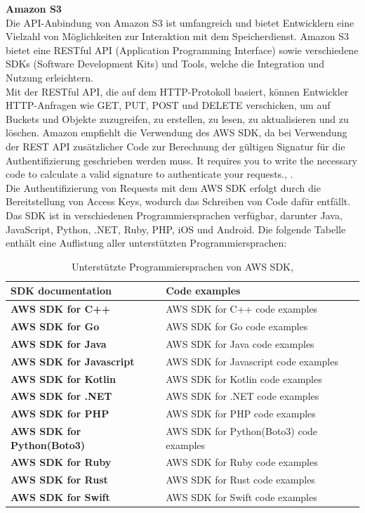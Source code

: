 \textbf{Amazon S3}\\

Die API-Anbindung von Amazon S3 ist umfangreich und bietet Entwicklern eine Vielzahl von Möglichkeiten zur Interaktion mit dem Speicherdienst. Amazon S3 bietet eine RESTful API (Application Programming Interface) sowie verschiedene SDKs (Software Development Kits) und Tools, welche die Integration und Nutzung erleichtern.\\

Mit der RESTful API, die auf dem HTTP-Protokoll basiert, können Entwickler HTTP-Anfragen wie GET, PUT, POST und DELETE verschicken, um auf Buckets und Objekte zuzugreifen, zu erstellen, zu lesen, zu aktualisieren und zu löschen. Amazon empfiehlt die Verwendung des AWS SDK, da bei Verwendung der REST API zusätzlicher Code zur Berechnung der gültigen Signatur für die Authentifizierung geschrieben werden muss. \glqq It requires you to write the necessary code to calculate a valid signature to authenticate your requests.\grqq, \cite{aws-api}.\\

Die Authentifizierung von Requests mit dem AWS SDK erfolgt durch die Bereitstellung von Access Keys, wodurch das Schreiben von Code dafür entfällt. Das SDK ist in verschiedenen Programmiersprachen verfügbar, darunter Java, JavaScript, Python, .NET, Ruby, PHP, iOS und Android. Die folgende Tabelle enthält eine Auflistung aller unterstützten Programmiersprachen:

\begin{table}[!h]
\centering
\begin{tabular}{ |p{5.5cm}|p{7cm}| }
\hline
\rowcolor{gray!30}
\textbf{SDK documentation} & \textbf{Code examples}\\
\hline
\textbf{AWS SDK for C++} & AWS SDK for C++ code examples\\
\textbf{AWS SDK for Go} & AWS SDK for Go code examples\\
\textbf{AWS SDK for Java}   & AWS SDK for Java code examples\\
\textbf{AWS SDK for Javascript}  & AWS SDK for Javascript code examples\\
\textbf{AWS SDK for Kotlin} & AWS SDK for Kotlin code examples\\
\textbf{AWS SDK for .NET} & AWS SDK for .NET code examples\\
\textbf{AWS SDK for PHP} & AWS SDK for PHP code examples\\
\textbf{AWS SDK for Python(Boto3)} & AWS SDK for Python(Boto3) code examples\\
\textbf{AWS SDK for Ruby} & AWS SDK for Ruby code examples\\
\textbf{AWS SDK for Rust} & AWS SDK for Rust code examples\\
\textbf{AWS SDK for Swift} & AWS SDK for Swift code examples\\
\hline
\end{tabular}
\caption{Unterstützte Programmiersprachen von AWS SDK, }
\end{table}

